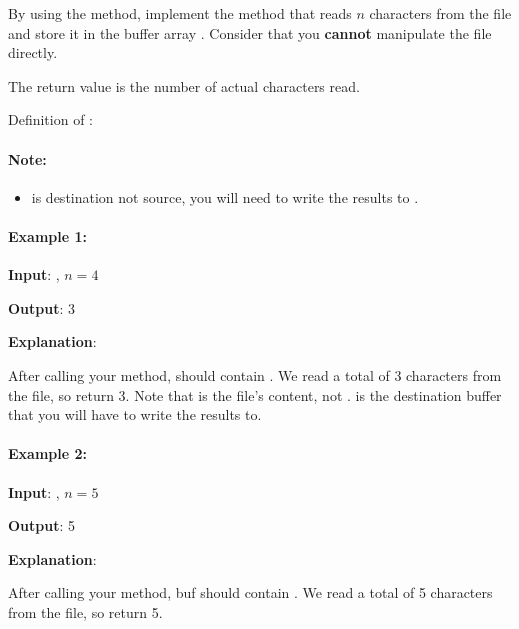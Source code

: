 \begin{flushleft}
By using the  method, implement the method  that reads $n$ characters from the file and store it in the buffer array . Consider that you \textbf{cannot} manipulate the file directly.

The return value is the number of actual characters read.

Definition of : 
\end{flushleft}

\paragraph{Note:} 

\begin{itemize}
\item {} is destination not source, you will need to write the results to .
\end{itemize}
 

\paragraph{Example 1:}

\begin{flushleft}
\textbf{Input}: , $n = 4$

\textbf{Output}: 3

\textbf{Explanation}: 

After calling your  method,  should contain . We read a total of 3 characters from the file, so return 3. Note that  is the file's content, not .  is the destination buffer that you will have to write the results to.

\end{flushleft}
\paragraph{Example 2:}

\begin{flushleft}
\textbf{Input}: , $n = 5$

\textbf{Output}: 5

\textbf{Explanation}: 

After calling your  method, buf should contain . We read a total of 5 characters from the file, so return 5.

\end{flushleft}

